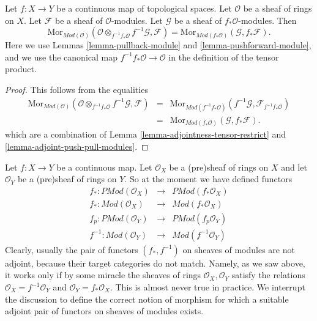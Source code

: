 \begin{lemma}
\label{lemma-adjoint-pull-push-modules}
Let $f : X \to Y$ be a continuous map of topological spaces.
Let $\mathcal{O}$ be a sheaf of rings on $X$.
Let $\mathcal{F}$ be a sheaf of $\mathcal{O}$-modules.
Let $\mathcal{G}$ be a sheaf of $f_*\mathcal{O}$-modules.
Then
$$
\text{Mor}_{\textit{Mod}(\mathcal{O})}(
\mathcal{O} \otimes_{f^{-1}f_*\mathcal{O}} f^{-1}\mathcal{G}, \mathcal{F})
=
\text{Mor}_{\textit{Mod}(f_*\mathcal{O})}(\mathcal{G}, f_*\mathcal{F}).
$$
Here we use
Lemmas \ref{lemma-pullback-module}
and \ref{lemma-pushforward-module}, and we use
the canonical map $f^{-1}f_*\mathcal{O} \to \mathcal{O}$
in the definition of the tensor product.
\end{lemma}

\begin{proof}
This follows from the equalities
\begin{eqnarray*}
\text{Mor}_{\textit{Mod}(\mathcal{O})}(
\mathcal{O} \otimes_{f^{-1}f_*\mathcal{O}} f^{-1}\mathcal{G}, \mathcal{F})
& = &
\text{Mor}_{\textit{Mod}(f^{-1}f_*\mathcal{O})}(
f^{-1}\mathcal{G}, \mathcal{F}_{f^{-1}f_*\mathcal{O}}) \\
& = &
\text{Mor}_{\textit{Mod}(f_*\mathcal{O})}(\mathcal{G}, f_*\mathcal{F}).
\end{eqnarray*}
which are a combination of
Lemma \ref{lemma-adjointness-tensor-restrict}
and \ref{lemma-adjoint-push-pull-modules}.
\end{proof}


\medskip\noindent
Let $f : X \to Y$ be a continuous map.
Let $\mathcal{O}_X$ be a (pre)sheaf of rings on $X$ and
let $\mathcal{O}_Y$ be a (pre)sheaf of rings on $Y$.
So at the moment we have defined functors
\begin{eqnarray*}
f_* : \textit{PMod}(\mathcal{O}_X) &
\longrightarrow &
\textit{PMod}(f_*\mathcal{O}_X) \\
f_* : \textit{Mod}(\mathcal{O}_X) &
\longrightarrow &
\textit{Mod}(f_*\mathcal{O}_X) \\
f_p : \textit{PMod}(\mathcal{O}_Y) &
\longrightarrow &
\textit{PMod}(f_p\mathcal{O}_Y) \\
f^{-1} : \textit{Mod}(\mathcal{O}_Y) &
\longrightarrow &
\textit{Mod}(f^{-1}\mathcal{O}_Y)
\end{eqnarray*}
Clearly, usually the pair of functors $(f_*, f^{-1})$
on sheaves of modules are not adjoint, because their target categories
do not match. Namely, as we saw above, it works only if by some miracle the
sheaves of rings $\mathcal{O}_X, \mathcal{O}_Y$ satisfy the
relations $\mathcal{O}_X = f^{-1}\mathcal{O}_Y$ and
$\mathcal{O}_Y = f_*\mathcal{O}_X$. This is almost never
true in practice. We interrupt the discussion to define
the correct notion of morphism for which a suitable adjoint
pair of functors on sheaves of modules exists.

